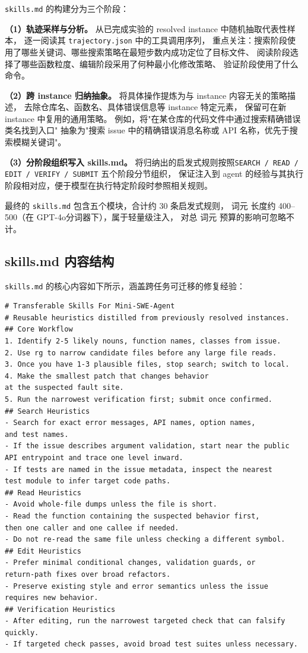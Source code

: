 \texttt{skills.md} 的构建分为三个阶段：

\textbf{（1）轨迹采样与分析。}
从已完成实验的 resolved instance 中随机抽取代表性样本，
逐一阅读其 \texttt{trajectory.json} 中的工具调用序列，
重点关注：搜索阶段使用了哪些关键词、哪些搜索策略在最短步数内成功定位了目标文件、
阅读阶段选择了哪些函数粒度、编辑阶段采用了何种最小化修改策略、
验证阶段使用了什么命令。

\textbf{（2）跨 instance 归纳抽象。}
将具体操作提炼为与 instance 内容无关的策略描述，
去除仓库名、函数名、具体错误信息等 instance 特定元素，
保留可在新 instance 中复用的通用策略。
例如，将"在某仓库的代码文件中通过搜索精确错误类名找到入口"
抽象为"搜索 issue 中的精确错误消息名称或 API 名称，优先于搜索模糊关键词"。

\textbf{（3）分阶段组织写入 skills.md。}
将归纳出的启发式规则按照\texttt{SEARCH / READ / EDIT / VERIFY / SUBMIT} 五个阶段分节组织，
保证注入到 agent 的经验与其执行阶段相对应，便于模型在执行特定阶段时参照相关规则。

最终的 \texttt{skills.md} 包含五个模块，合计约 30 条启发式规则，
词元 长度约 400--500（在 GPT-4o分词器下），属于轻量级注入，
对总 词元 预算的影响可忽略不计。

\subsection{skills.md 内容结构}
\texttt{skills.md} 的核心内容如下所示，涵盖跨任务可迁移的修复经验：

\begin{lstlisting}[style=promptstyle, caption={skills.md 内容节选（搜索与阅读启发式）}, label={lst:skills-md}]
# Transferable Skills For Mini-SWE-Agent
# Reusable heuristics distilled from previously resolved instances.
## Core Workflow
1. Identify 2-5 likely nouns, function names, classes from issue.
2. Use rg to narrow candidate files before any large file reads.
3. Once you have 1-3 plausible files, stop search; switch to local.
4. Make the smallest patch that changes behavior 
at the suspected fault site.
5. Run the narrowest verification first; submit once confirmed.
## Search Heuristics
- Search for exact error messages, API names, option names, 
and test names.
- If the issue describes argument validation, start near the public 
API entrypoint and trace one level inward.
- If tests are named in the issue metadata, inspect the nearest 
test module to infer target code paths.
## Read Heuristics
- Avoid whole-file dumps unless the file is short.
- Read the function containing the suspected behavior first, 
then one caller and one callee if needed.
- Do not re-read the same file unless checking a different symbol.
## Edit Heuristics
- Prefer minimal conditional changes, validation guards, or 
return-path fixes over broad refactors.
- Preserve existing style and error semantics unless the issue 
requires new behavior.
## Verification Heuristics
- After editing, run the narrowest targeted check that can falsify quickly.
- If targeted check passes, avoid broad test suites unless necessary.
\end{lstlisting}

